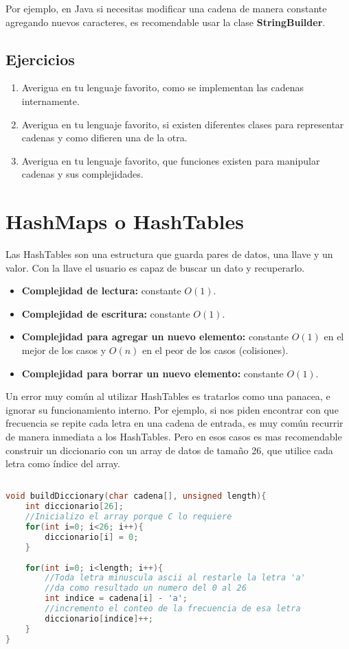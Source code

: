 Por ejemplo, en Java si necesitas modificar una cadena de manera constante agregando nuevos caracteres, es recomendable usar la clase \textbf{StringBuilder}.

\subsection{Ejercicios}

\begin{enumerate}
    \item Averigua en tu lenguaje favorito, como se implementan las cadenas internamente.
    \item Averigua en tu lenguaje favorito, si existen diferentes clases para representar cadenas y como difieren una de la otra.
    \item Averigua en tu lenguaje favorito, que funciones existen para manipular cadenas y sus complejidades.
\end{enumerate}

\section{HashMaps o HashTables}

Las HashTables son una estructura que guarda pares de datos, una llave y un valor. 
Con la llave el usuario es capaz de buscar un dato y recuperarlo.

\begin{itemize}
    \item \textbf{Complejidad de lectura:} constante $O(1)$.
    \item \textbf{Complejidad de escritura:} constante $O(1)$.
    \item \textbf{Complejidad para agregar un nuevo elemento:} constante $O(1)$ en el mejor de los casos y $O(n)$ en el peor de los casos (colisiones).
    \item \textbf{Complejidad para borrar un nuevo elemento:} constante $O(1)$.
\end{itemize}

Un error muy común al utilizar HashTables es tratarlos como una panacea, e ignorar su funcionamiento interno. Por ejemplo, si nos piden encontrar con que frecuencia se repite cada letra en una cadena de entrada, es muy común recurrir de manera inmediata a los HashTables. Pero en esos casos es mas recomendable construir un diccionario con un array de datos de tamaño 26, que utilice cada letra como índice del array.

\begin{lstlisting}[language=C, caption=Diccionario sin hashtables]

void buildDiccionary(char cadena[], unsigned length){
    int diccionario[26];
    //Inicializo el array porque C lo requiere
    for(int i=0; i<26; i++){
        diccionario[i] = 0;
    }
    
    for(int i=0; i<length; i++){
        //Toda letra minuscula ascii al restarle la letra 'a'
        //da como resultado un numero del 0 al 26
        int indice = cadena[i] - 'a'; 
        //incremento el conteo de la frecuencia de esa letra
        diccionario[indice]++;
    }
}
\end{lstlisting}

